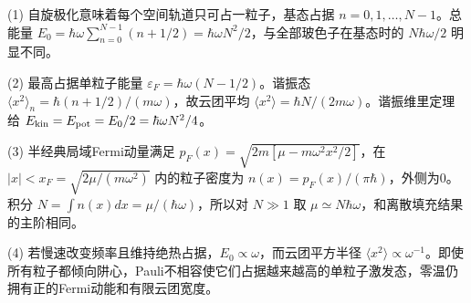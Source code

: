 (1) 自旋极化意味着每个空间轨道只可占一粒子，基态占据 \(n=0,1,\dots,N-1\)。总能量 \(E_0=\hbar\omega\sum_{n=0}^{N-1}(n+1/2)=\boxed{\hbar\omega N^2/2}\)，与全部玻色子在基态时的 \(N\hbar\omega/2\) 明显不同。

(2) 最高占据单粒子能量 \(\varepsilon_F=\hbar\omega(N-1/2)\)。谐振态 \(\langle x^2\rangle_n=\hbar(n+1/2)/(m\omega)\)，故云团平均 \(\langle x^2\rangle=\hbar N/(2m\omega)\)。谐振维里定理给 \(E_{\rm kin}=E_{\rm pot}=E_0/2=\hbar\omega N^2/4\)。

(3) 半经典局域Fermi动量满足 \(p_F(x)=\sqrt{2m[\mu-m\omega^2x^2/2]}\)，在 \(|x|<x_F=\sqrt{2\mu/(m\omega^2)}\) 内的粒子密度为 \(\boxed{n(x)=p_F(x)/(\pi\hbar)}\)，外侧为0。积分 \(N=\int n(x)dx=\mu/(\hbar\omega)\)，所以对 \(N\gg1\) 取 \(\mu\simeq N\hbar\omega\)，和离散填充结果的主阶相同。

(4) 若慢速改变频率且维持绝热占据，\(E_0\propto\omega\)，而云团平方半径 \(\langle x^2\rangle\propto\omega^{-1}\)。即使所有粒子都倾向阱心，Pauli不相容使它们占据越来越高的单粒子激发态，零温仍拥有正的Fermi动能和有限云团宽度。
